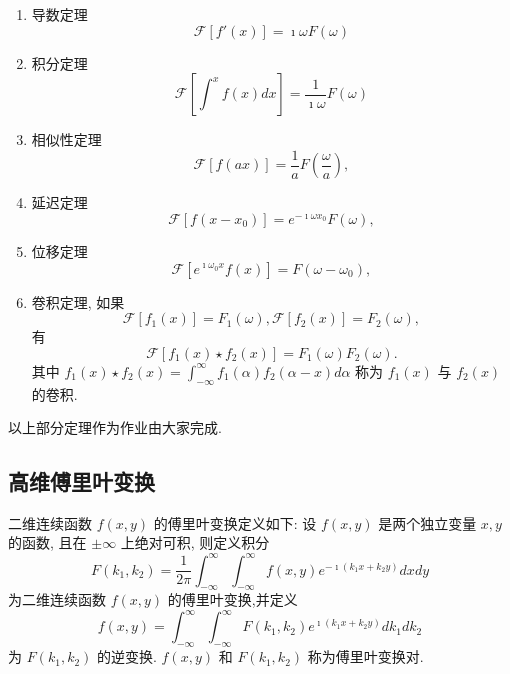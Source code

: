 \begin{enumerate}
    \item 导数定理
    \begin{equation}
        \mathcal{F} [f'(x)] = \imath \omega F(\omega)
    \end{equation}

    \item 积分定理
    \begin{equation}
        \mathcal{F} [ \int^{x} f(x) dx ] = \frac{1}{\imath \omega} F(\omega)
    \end{equation}

    \item 相似性定理
    \begin{equation}
        \mathcal{F} [ f(ax) ] = \frac{1}{a} F(\frac{\omega}{a}),
    \end{equation}
    \item 延迟定理
    \begin{equation}
        \mathcal{F} [ f(x - x_0 ) ] = e^{-\imath \omega x_0} F(\omega),
    \end{equation}
    \item 位移定理
    \begin{equation}
        \mathcal{F} [ e^{\imath \omega_0 x} f(x) ] = F(\omega - \omega_0),
    \end{equation}
    \item 卷积定理, 如果
    \[
        \mathcal{F} [f_1(x)] =  F_1(\omega), \mathcal{F} [f_2(x)] =  F_2(\omega), 
    \]
    有
    \begin{equation}
        \mathcal{F} [f_1(x)\star f_2(x) ] = F_1(\omega) F_2(\omega).
    \end{equation}
    其中 $f_1(x) \star f_2(x)=\int_{-\infty}^{\infty} f_1(\alpha) f_2(\alpha-x) d \alpha$ 称为 $f_1(x)$ 与 $f_2(x)$ 的卷积.
\end{enumerate}
以上部分定理作为作业由大家完成.
\subsection{高维傅里叶变换}

二维连续函数 $f(x, y)$ 的傅里叶变换定义如下:
设 $f(x, y)$ 是两个独立变量 $x, y$ 的函数, 且在 $\pm \infty$ 上绝对可积, 则定义积分
$$
F\left(k_1, k_2\right)=\frac{1}{2 \pi} \int_{-\infty}^{\infty} \int_{-\infty}^{\infty} f(x, y) e^{-\imath\left(k_1 x+k_2 y\right)} d x d y
$$
为二维连续函数 $f(x, y)$ 的傅里叶变换,并定义
$$
f(x, y)=\int_{-\infty}^{\infty} \int_{-\infty}^{\infty} F\left(k_1, k_2\right) e^{\imath\left(k_1 x+k_2 y\right)} d k_1 d k_2
$$
为 $F\left(k_1, k_2\right)$ 的逆变换.
$f(x, y)$ 和 $F\left(k_1, k_2\right)$ 称为傅里叶变换对.

